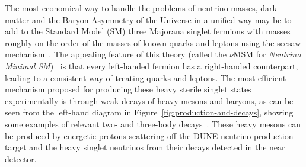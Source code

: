   The most economical way to handle the problems of neutrino masses,
  dark matter and the Baryon Asymmetry of the Universe in a unified
  way may be to add to the Standard Model (SM) three Majorana singlet
  fermions with masses roughly on the order of the masses of known
  quarks and leptons using the seesaw
  mechanism~\cite{Yanagida:1980xy}. The appealing feature of this
  theory (called the $\nu$MSM for \emph{Neutrino Minimal
    SM})~\cite{Asaka:2005pn} is that every left-handed fermion has a
  right-handed counterpart, leading to a consistent way of treating
  quarks and leptons.
  The most efficient mechanism proposed for producing these heavy
  sterile singlet states experimentally is through weak decays of
  heavy mesons and baryons, as can be seen from the left-hand diagram
  in Figure~\ref{fig:production-and-decays}, showing some examples of
  relevant two- and three-body decays~\cite{Gorbunov:2007ak}. These
  heavy mesons can be produced by energetic protons scattering off the
  DUNE neutrino production target and the heavy singlet neutrinos from their
  decays detected in the near detector.

